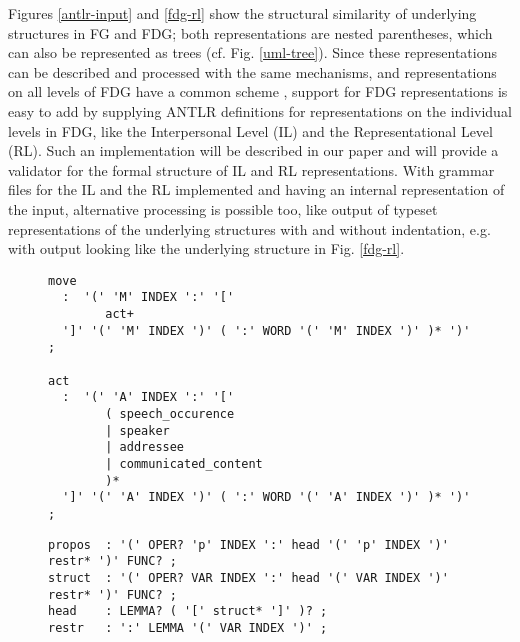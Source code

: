 \documentclass[a4paper, halfparskip, onecolumn, abstracton, final, figurecaptionabove]{scrartcl}
\begin{document}
Figures \ref{antlr-input} and \ref{fdg-rl} show the structural similarity of underlying structures in FG and FDG; both representations are nested parentheses, which can also be represented as trees (cf. Fig. \ref{uml-tree}). Since these representations can be described and processed with the same mechanisms, and representations on all levels of FDG have a common scheme \citep[671]{HengeveldAndMackenzie2006}, support for FDG representations is easy to add by supplying ANTLR definitions for representations on the individual levels in FDG, like the Interpersonal Level (IL) and the Representational Level (RL). Such an implementation will be described in our paper and will provide a validator for the formal structure of IL and RL representations. With grammar files for the IL and the RL implemented and having an internal representation of the input, alternative processing is possible too, like output of typeset representations of the underlying structures with and without indentation, e.g. with output looking like the underlying structure in Fig. \ref{fdg-rl}.

\begin{figure}

\begin{verbatim}
move
  :  '(' 'M' INDEX ':' '['
        act+
  ']' '(' 'M' INDEX ')' ( ':' WORD '(' 'M' INDEX ')' )* ')' ;
			
act
  :  '(' 'A' INDEX ':' '['
        ( speech_occurence
        | speaker
        | addressee
        | communicated_content
        )*
  ']' '(' 'A' INDEX ')' ( ':' WORD '(' 'A' INDEX ')' )* ')' ;
\end{verbatim}

 \label{antlr-def1}
\end{figure}

\begin{figure}
\begin{center}
\end{center}
 \label{antlr-il}
\end{figure}

\begin{figure}

\begin{verbatim}
propos  : '(' OPER? 'p' INDEX ':' head '(' 'p' INDEX ')' restr* ')' FUNC? ;
struct  : '(' OPER? VAR INDEX ':' head '(' VAR INDEX ')' restr* ')' FUNC? ;
head    : LEMMA? ( '[' struct* ']' )? ;
restr   : ':' LEMMA '(' VAR INDEX ')' ;
\end{verbatim}

 \label{antlr-rl-parser}
\end{figure}
\end{document}
